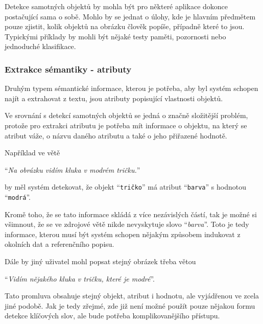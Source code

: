
Detekce samotných objektů by mohla být pro některé aplikace dokonce postačující sama o sobě.
Mohlo by se jednat o úlohy, kde je hlavním předmětem pouze zjistit, kolik objektů na obrázku člověk popíše, případně které to jsou.
Typickými příklady by mohli být nějaké testy paměti, pozornosti nebo jednoduché klasifikace.

\newpage
\subsubsection{Extrakce sémantiky - atributy}
Druhým typem sémantické informace, kterou je potřeba, aby byl systém schopen najít a extrahovat z textu, jsou atributy popisující vlastnosti objektů.

Ve srovnání s detekcí samotných objektů se jedná o značně složitější problém, protože pro extrakci atributu je potřeba mít informace o objektu,
na který se atribut váže, o názvu daného atributu a také o jeho přiřazené hodnotě.

Například ve větě
\begin{center}
	\enquote{\emph{Na obrázku vidím kluka v modrém tričku.}}
\end{center}
by měl systém detekovat, že objekt \enquote{\texttt{tričko}} má atribut \enquote{\texttt{barva}} s hodnotou \enquote{\texttt{modrá}}.

Kromě toho, že se tato informace skládá z více nezávislých částí, tak je možné si všimnout, že se ve zdrojové větě nikde nevyskytuje slovo \enquote{\emph{barva}}.
Toto je tedy informace, kterou musí být systém schopen nějakým způsobem indukovat z okolních dat a referenčního popisu.

Dále by jiný uživatel mohl popsat stejný obrázek třeba větou
\begin{center}
	\enquote{\emph{Vidím nějakého kluka v tričku, které je modré}}.
\end{center}
Tato promluva obsahuje stejný objekt, atribut i hodnotu, ale vyjádřenou ve zcela jiné podobě.
Jak je tedy zřejmé, zde již není možné použít pouze nějakou formu detekce klíčových slov, ale bude potřeba komplikovanějšího přístupu.

